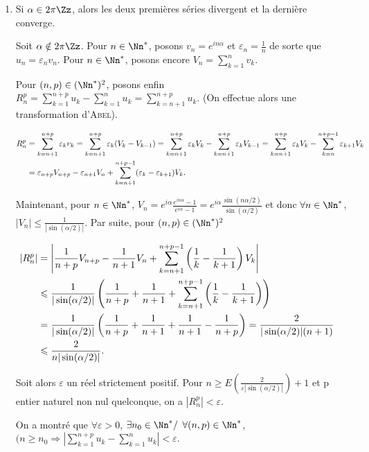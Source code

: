 {{\begin{enumerate}
\textbf{Remarque.} La série de terme général $u_n$ diverge bien que $u_n$ soit équivalent au terme général d'une série convergente.

\item  Si $\alpha\in2\pi\Zz$, alors les deux premières séries divergent et la dernière converge.

Soit $\alpha\notin2\pi\Zz$. Pour $n\in\Nn^*$, posons $v_n=e^{in\alpha}$ et $\varepsilon_n=\frac{1}{n}$ de sorte que $u_n=\varepsilon_nv_n$. Pour $n\in\Nn^*$, posons encore $V_n =\sum_{k=1}^{n}v_k$.

Pour $(n ,p)\in(\Nn^*)^2$, posons enfin $R_n^p=\sum_{k=1}^{n+p}u_k-\sum_{k=1}^{n}u_k=\sum_{k=n+1}^{n+p}u_k$. (On effectue alors une transformation d'\textsc{Abel}).

\begin{align*}\ensuremath
R_n^p&=\sum_{k=n+1}^{n+p}\varepsilon_kv_k =\sum_{k=n+1}^{n+p}\varepsilon_k(V_k-V_{k-1}) =\sum_{k=n+1}^{n+p}\varepsilon_kV_k-\sum_{k=n+1}^{n+p}\varepsilon_kV_{k-1} =\sum_{k=n+1}^{n+p}\varepsilon_kV_k-\sum_{k=n}^{n+p-1}\varepsilon_{k+1}V_{k}\\
 &=\varepsilon_{n+p}V_{n+p}-\varepsilon_{n+1}V_n+ \sum_{k=n+1}^{n+p-1}(\varepsilon_k-\varepsilon_{k+1})V_k.
\end{align*}

Maintenant, pour $n\in\Nn^*$, $V_n=e^{i\alpha}\frac{e^{in\alpha}-1}{e^{i\alpha}-1}=e^{i\alpha}\frac{\sin(n\alpha/2)}{\sin(\alpha/2)}$  et donc $\forall n\in\Nn^*$, $|V_n|\leqslant\frac{1}{|\sin(\alpha/2)|}$. Par suite, pour $(n,p)\in(\Nn^*)^2$

\begin{align*}\ensuremath
|R_n^p|&=\left|\frac{1}{n+p}V_{n+p}-\frac{1}{n+1}V_n+ \sum_{k=n+1}^{n+p-1}\left(\frac{1}{k}-\frac{1}{k+1}\right)V_k\right|&\\
 &\leqslant\frac{1}{|\sin(\alpha/2)|}\left(\frac{1}{n+p}+\frac{1}{n+1}+ \sum_{k=n+1}^{n+p-1}\left(\frac{1}{k}-\frac{1}{k+1}\right)\right)\\
 &=\frac{1}{|\sin(\alpha/2)|}\left(\frac{1}{n+p}+\frac{1}{n+1}+\frac{1}{n+1}-\frac{1}{n+p}\right)=\frac{2}{|\sin(\alpha/2)|(n+1)}\\
  &\leqslant\frac{2}{n|\sin(\alpha/2)|}.
\end{align*}

Soit alors $\varepsilon$ un réel strictement positif. Pour $n\geqslant E\left(\frac{2}{\varepsilon|\sin(\alpha/2)|}\right)+ 1$ et p entier naturel non nul quelconque, on a $|R_n^p|<\varepsilon$.

On a montré que $\forall\varepsilon>0$, $\exists n_0\in\Nn^*/$ $\forall(n,p)\in\Nn^*$, $(n\geqslant n_0\Rightarrow\left|\sum_{k=1}^{n+p}u_k-\sum_{k=1}^{n}u_k\right|<\varepsilon$.


\end{enumerate}}}
